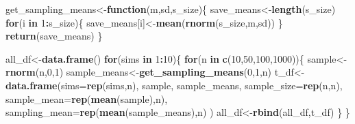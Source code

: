 \documentclass[
]{book}
\newenvironment{Shaded}{\begin{snugshade}}{\end{snugshade}}
\newcommand{\ControlFlowTok}[1]{\textcolor[rgb]{0.13,0.29,0.53}{\textbf{#1}}}
\newcommand{\DataTypeTok}[1]{\textcolor[rgb]{0.13,0.29,0.53}{#1}}
\newcommand{\DecValTok}[1]{\textcolor[rgb]{0.00,0.00,0.81}{#1}}
\newcommand{\KeywordTok}[1]{\textcolor[rgb]{0.13,0.29,0.53}{\textbf{#1}}}
\newcommand{\NormalTok}[1]{#1}
\newcommand{\OperatorTok}[1]{\textcolor[rgb]{0.81,0.36,0.00}{\textbf{#1}}}
\begin{document}
\begin{Shaded}
\begin{Highlighting}[]
\NormalTok{get_sampling_means<-}\ControlFlowTok{function}\NormalTok{(m,sd,s_size)\{}
\NormalTok{  save_means<-}\KeywordTok{length}\NormalTok{(s_size)}
  \ControlFlowTok{for}\NormalTok{(i }\ControlFlowTok{in} \DecValTok{1}\OperatorTok{:}\NormalTok{s_size)\{}
\NormalTok{    save_means[i]<-}\KeywordTok{mean}\NormalTok{(}\KeywordTok{rnorm}\NormalTok{(s_size,m,sd))}
\NormalTok{  \}}
  \KeywordTok{return}\NormalTok{(save_means)}
\NormalTok{\}}

\NormalTok{all_df<-}\KeywordTok{data.frame}\NormalTok{()}
\ControlFlowTok{for}\NormalTok{(sims }\ControlFlowTok{in} \DecValTok{1}\OperatorTok{:}\DecValTok{10}\NormalTok{)\{}
  \ControlFlowTok{for}\NormalTok{(n }\ControlFlowTok{in} \KeywordTok{c}\NormalTok{(}\DecValTok{10}\NormalTok{,}\DecValTok{50}\NormalTok{,}\DecValTok{100}\NormalTok{,}\DecValTok{1000}\NormalTok{))\{}
\NormalTok{    sample<-}\KeywordTok{rnorm}\NormalTok{(n,}\DecValTok{0}\NormalTok{,}\DecValTok{1}\NormalTok{)}
\NormalTok{    sample_means<-}\KeywordTok{get_sampling_means}\NormalTok{(}\DecValTok{0}\NormalTok{,}\DecValTok{1}\NormalTok{,n)}
\NormalTok{    t_df<-}\KeywordTok{data.frame}\NormalTok{(}\DataTypeTok{sims=}\KeywordTok{rep}\NormalTok{(sims,n),}
\NormalTok{                     sample,}
\NormalTok{                     sample_means,}
                     \DataTypeTok{sample_size=}\KeywordTok{rep}\NormalTok{(n,n),}
                     \DataTypeTok{sample_mean=}\KeywordTok{rep}\NormalTok{(}\KeywordTok{mean}\NormalTok{(sample),n),}
                     \DataTypeTok{sampling_mean=}\KeywordTok{rep}\NormalTok{(}\KeywordTok{mean}\NormalTok{(sample_means),n)}
\NormalTok{                     )}
\NormalTok{    all_df<-}\KeywordTok{rbind}\NormalTok{(all_df,t_df)}
\NormalTok{  \}}
\NormalTok{\}}



\end{Highlighting}
\end{Shaded}
\end{document}
